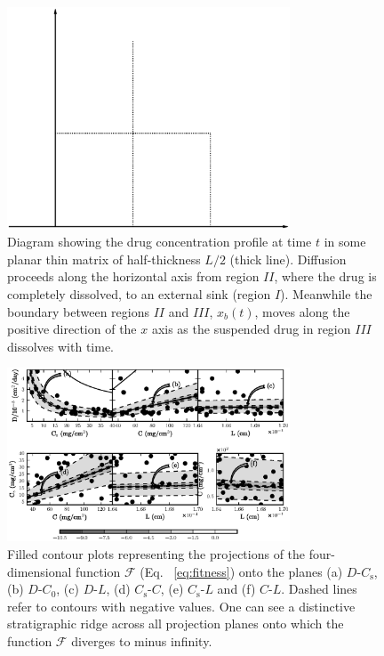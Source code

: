 \documentclass[superbib,unsortedaddress,preprint,byrevtex,aps,noshowpacs,titlepage]{revtex4}
\def\calF{\mathcal{F}}
\def\Co{C_0}
\def\Cs{C_\text{s}}
\begin{document}
%
%
%
\begin{figure}
  \centering
  \includegraphics[width=0.75\textwidth]{figures/higuchi_sketch.eps}
  \caption{Diagram showing the drug concentration profile at time $t$ in some planar 
    thin matrix of half-thickness $L/2$ (thick line). 
    Diffusion proceeds along the horizontal axis from region $II$, where the drug is
    completely dissolved, to an external sink (region $I$). Meanwhile the boundary 
    between regions $II$ and $III$, $x_b(t)$, moves along the positive direction of the 
    $x$ axis as the suspended drug in region $III$ dissolves with time.} 
  \label{fig:sketch}
\end{figure}
\clearpage

\begin{figure}
  \centering
  \includegraphics[width=0.75\textwidth]{figures/higuchi_proj.eps}
  \caption{Filled contour plots representing the projections of the four-dimensional
    function $\calF$ (Eq. ~\ref{eq:fitness}) onto the planes (a) $D$-$\Cs$, (b) $D$-$\Co$, 
    (c) $D$-$L$, (d) $\Cs$-$C$, (e) $\Cs$-$L$ and (f) $C$-$L$. Dashed lines refer to 
    contours with negative values. One can see a distinctive stratigraphic ridge across all
    projection planes onto which the function $\calF$ diverges to minus infinity.
  }
  \label{fig:higuchi}
\end{figure}
\clearpage
\end{document}
